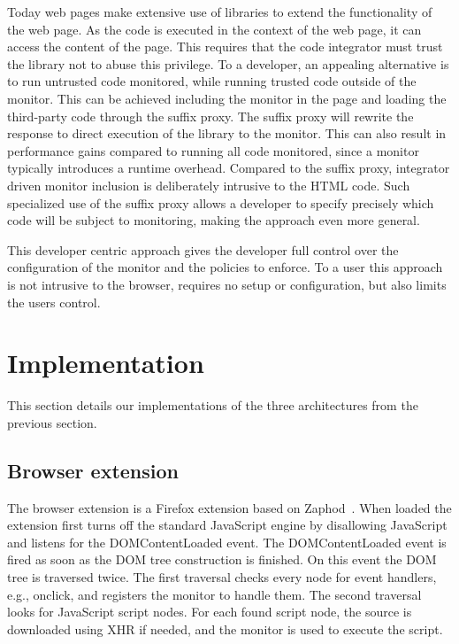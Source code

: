 \documentclass{llncs}
\newcommand{\todo}[1]{\colorbox{red}{\textcolor{white}{\sffamily\bfseries\scriptsize TODO}} \textcolor{red}{#1} \textcolor{red}{$\blacktriangleleft$}}
\begin{document}
Today web pages make extensive use of libraries to extend the functionality of 
the web page. As the code is executed in the context of the web page, it can 
access the content of the page. This requires that the code integrator must 
trust the library not to abuse this privilege. To a developer, an appealing alternative 
is to run untrusted code monitored, while running trusted code outside of the 
monitor. This can be achieved including the monitor in the page and loading the 
third-party code through the suffix proxy. The suffix proxy will rewrite the 
response to direct execution of the library to the monitor. This can also result in performance 
gains compared to running all code monitored, since a monitor typically introduces 
a runtime overhead. Compared to the suffix proxy, integrator driven monitor 
inclusion is deliberately intrusive to the HTML code. Such specialized use of the suffix 
proxy allows a developer to specify precisely which code will be subject to 
monitoring, making the approach even more general. 

This developer centric approach gives the developer full control over the 
configuration of the monitor and the policies to enforce. To a user this 
approach is not intrusive to the browser, requires no setup or configuration, 
but also limits the users control. 


\section{Implementation}
\label{sec:impl}

This section details our implementations of the three architectures
from the previous section. 


\subsection{Browser extension}

The browser extension is a Firefox extension based on Zaphod~\cite{Zaphod}.
When loaded the extension first turns off the standard JavaScript engine by
disallowing JavaScript and listens for the DOMContentLoaded event.  The
DOMContentLoaded event is fired as soon as the DOM tree construction is
finished.  On this event the DOM tree is traversed twice. The first traversal
checks every node for event handlers, e.g., onclick, and registers the monitor
to handle them. The second traversal looks for JavaScript script nodes.  For
each found script node, the source is downloaded using XHR if needed, and the
monitor is used to execute the script.
\end{document}
